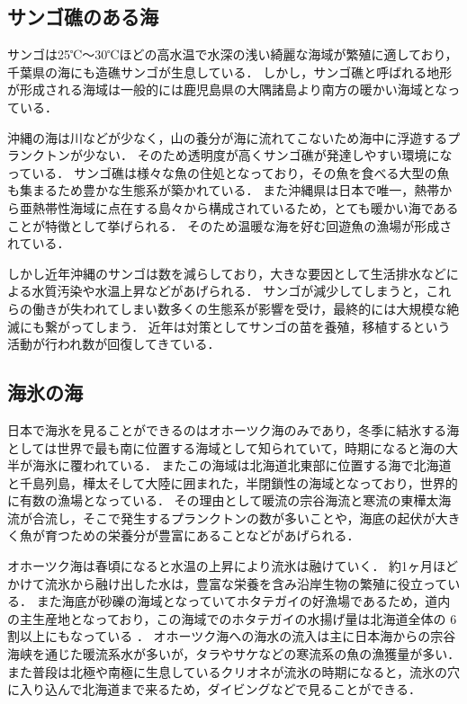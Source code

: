 \documentclass[12pt,a4j,titlepage]{ltjsarticle}
\begin{document}
\subsection{サンゴ礁のある海}
サンゴは25℃〜30℃ほどの高水温で水深の浅い綺麗な海域が繁殖に適しており，千葉県の海にも造礁サンゴが生息している．
しかし，サンゴ礁と呼ばれる地形が形成される海域は一般的には鹿児島県の大隅諸島より南方の暖かい海域となっている．\par
沖縄の海は川などが少なく，山の養分が海に流れてこないため海中に浮遊するプランクトンが少ない\cite{okinawa}．
そのため透明度が高くサンゴ礁が発達しやすい環境になっている．
サンゴ礁は様々な魚の住処となっており，その魚を食べる大型の魚も集まるため豊かな生態系が築かれている．
また沖縄県は日本で唯一，熱帯から亜熱帯性海域に点在する島々から構成されているため，とても暖かい海であることが特徴として挙げられる．
そのため温暖な海を好む回遊魚の漁場が形成されている．\par
しかし近年沖縄のサンゴは数を減らしており，大きな要因として生活排水などによる水質汚染や水温上昇などがあげられる．
サンゴが減少してしまうと，これらの働きが失われてしまい数多くの生態系が影響を受け，最終的には大規模な絶滅にも繋がってしまう．
近年は対策としてサンゴの苗を養殖，移植するという活動が行われ数が回復してきている．
\subsection{海氷の海}
日本で海氷を見ることができるのはオホーツク海のみであり，冬季に結氷する海としては世界で最も南に位置する海域として知られていて，時期になると海の大半が海氷に覆われている．
またこの海域は北海道北東部に位置する海で北海道と千島列島，樺太そして大陸に囲まれた，半閉鎖性の海域となっており，世界的に有数の漁場となっている\cite{ohotuku}．
その理由として暖流の宗谷海流と寒流の東樺太海流が合流し，そこで発生するプランクトンの数が多いことや，海底の起伏が大きく魚が育つための栄養分が豊富にあることなどがあげられる．\par
オホーツク海は春頃になると水温の上昇により流氷は融けていく．
約1ヶ月ほどかけて流氷から融け出した水は，豊富な栄養を含み沿岸生物の繁殖に役立っている．
また海底が砂礫の海域となっていてホタテガイの好漁場であるため，道内の主生産地となっており，この海域でのホタテガイの水揚げ量は北海道全体の 6 割以上にもなっている ．
オホーツク海への海水の流入は主に日本海からの宗谷海峡を通じた暖流系水が多いが，タラやサケなどの寒流系の魚の漁獲量が多い．
また普段は北極や南極に生息しているクリオネが流氷の時期になると，流氷の穴に入り込んで北海道まで来るため，ダイビングなどで見ることができる．
\clearpage
\end{document}
